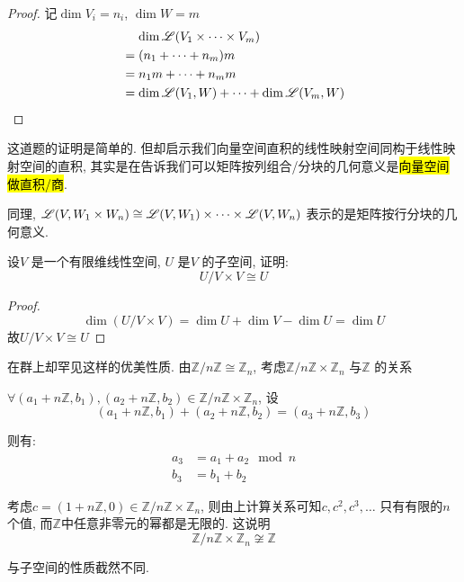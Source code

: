 \begin{proof}
    记\(\dim V_{i}=n_{i}\), \(\dim W=m\)
    \begin{align*}
        &\mathrel{\phantom{=}}\dim \mathscr{L}(V_{1} \times
        \dots \times V_{m}) \\
        &= (n_1+\dots+n_{m})m \\
        &= n_{1}m + \dots + n_{m}m \\
        &= \dim \mathscr{L}(V_{1},W) + \dots +
        \dim \mathscr{L}(V_{m},W)\\
    \end{align*}
\end{proof}
这道题的证明是简单的. 但却启示我们向量空间直积的线性映射空间同构于线性映射空间的直积,
其实是在告诉我们可以矩阵按列组合/分块的几何意义是\hl{向量空间做直积/商}.

同理, \(\mathscr{L}(V,W_1\times W_{n})\cong
    \mathscr{L}(V,W_1)\times \dots \times
\mathscr{L}(V,W_{n})\) 表示的是矩阵按行分块的几何意义.

\begin{problem}
    设\(V\) 是一个有限维线性空间, \(U\) 是\(V\) 的子空间, 证明:
    \[
        U/V \times V \cong U
    \]
\end{problem}

\begin{proof}
    \[
        \dim (U/V \times V) = \dim U + \dim V - \dim U = \dim U
    \]
    故\(U/V \times V \cong U\)
\end{proof}

在群上却罕见这样的优美性质. 由\(\mathbb{Z}/n\mathbb{Z} \cong
\mathbb{Z}_{n}\),
考虑\(\mathbb{Z}/n\mathbb{Z}\times\mathbb{Z}_{n}\) 与\(\mathbb{Z}\) 的关系

\(\forall (a_1+n\mathbb{Z}, b_1),(a_2+n\mathbb{Z}, b_2) \in
\mathbb{Z}/n\mathbb{Z} \times \mathbb{Z}_{n}\), 设\[
    (a_1+n\mathbb{Z}, b_1)+(a_2+n\mathbb{Z}, b_2) =
    (a_3+n\mathbb{Z}, b_3)
\]

则有:
\begin{align*}
    a_3 &= a_1 + a_2 \mod n \\
    b_3 &= b_1 + b_2
\end{align*}

考虑\(c=(1+n\mathbb{Z},0) \in \mathbb{Z}/n\mathbb{Z} \times
\mathbb{Z}_{n}\), 则由上计算关系可知\(c, c^{2}, c^{3}, \dots \) 只有有限的\(n\) 个值,
而\(\mathbb{Z}\)中任意非零元的幂都是无限的. 这说明
\[
    \mathbb{Z}/n\mathbb{Z} \times \mathbb{Z}_{n} \not\cong
    \mathbb{Z}
\]

与子空间的性质截然不同.

